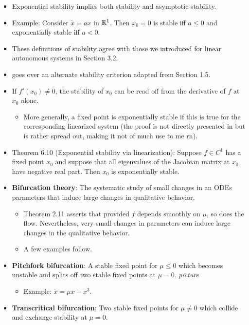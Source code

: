 \documentclass[../notes.tex]{subfiles}
\begin{document}
\begin{itemize}
    \item Exponential stability implies both stability and asymptotic stability.
    \item Example: Consider $\dot{x}=ax$ in $\mathbb{R}^1$. Then $x_0=0$ is stable iff $a\leq 0$ and exponentially stable iff $a<0$.
    \item These definitions of stability agree with those we introduced for linear autonomous systems in Section 3.2.
    \item \textcite{bib:Teschl} goes over an alternate stability criterion adapted from Section 1.5.
    \item If $f'(x_0)\neq 0$, the stability of $x_0$ can be read off from the derivative of $f$ at $x_0$ alone.
    \begin{itemize}
        \item More generally, a fixed point is exponentially stable if this is true for the corresponding linearized system (the proof is not directly presented in \textcite{bib:Teschl} but is rather spread out, making it not of much use to me rn).
    \end{itemize}
    \item Theorem 6.10 (Exponential stability via linearization): Suppose $f\in C^1$ has a fixed point $x_0$ and suppose that all eigenvalues of the Jacobian matrix at $x_0$ have negative real part. Then $x_0$ is exponentially stable.
    \item \textbf{Bifurcation theory}: The systematic study of small changes in an ODEs parameters that induce large changes in qualitative behavior.
    \begin{itemize}
        \item Theorem 2.11 asserts that provided $f$ depends smoothly on $\mu$, so does the flow. Nevertheless, very small changes in parameters can induce large changes in the qualitative behavior.
        \item A few examples follow.
    \end{itemize}
    \item \textbf{Pitchfork bifurcation}: A stable fixed point for $\mu\leq 0$ which becomes unstable and splits off two stable fixed points at $\mu=0$.
    \emph{picture}
    \begin{itemize}
        \item Example: $\dot{x}=\mu x-x^3$.
    \end{itemize}
    \item \textbf{Transcritical bifurcation}: Two stable fixed points for $\mu\neq 0$ which collide and exchange stability at $\mu=0$.

\end{itemize}
\end{document}
